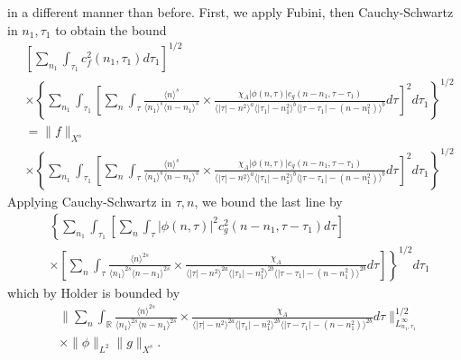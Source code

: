 \documentclass[12pt,reqno]{amsart}
\numberwithin{equation}{section}  %
\newcommand{\rr}{\mathbb{R}}
\begin{document}
in a different manner than before. First, we apply 
Fubini, then Cauchy-Schwartz in $n_{1}, \tau_{1}$ to obtain the bound
%
%
\begin{equation*}
\begin{split}
  & \left[ \sum_{n_{1}} \int_{\tau_{1}} c_{f}^{2}(n_{1}, \tau_{1}) d \tau_{1}
  \right]^{1/2}
  \\
  & \times \left \{ \sum_{n_{1}} \int_{\tau_{1}}   
 \left[
 \sum_{n} \int_{\tau}
   \frac{\langle n \rangle ^{s}}{\langle n_{1} \rangle ^{s} \langle
   n - n_{1}\rangle ^{s}} \times \frac{\chi_{A} |\phi(n, \tau)| c_{g}(n -
   n_{1}, \tau - \tau_{1})
}{\langle | \tau | - n^{2} \rangle
  ^{a} \langle | \tau_{1} | - n_{1}^{2} \rangle ^{b} \langle | \tau -
  \tau_{1} | - (n - n_{1}^{2}) \rangle ^{b}} d \tau 
  \right]^{2} d \tau_{1} \right \}^{1/2}
  \\
  & = \| f \|_{X^{s}}
  \\
  & \times \left \{ \sum_{n_{1}} \int_{\tau_{1}}   
 \left[
 \sum_{n} \int_{\tau}
   \frac{\langle n \rangle ^{s}}{\langle n_{1} \rangle ^{s} \langle
   n - n_{1}\rangle ^{s}} \times \frac{\chi_{A}|\phi(n, \tau)| c_{g}(n -
   n_{1}, \tau - \tau_{1})
}{\langle | \tau | - n^{2} \rangle
  ^{a} \langle | \tau_{1} | - n_{1}^{2} \rangle ^{b} \langle | \tau -
  \tau_{1} | - (n - n_{1}^{2}) \rangle ^{b}} d \tau 
  \right]^{2} d \tau_{1}  \right \}^{1/2}
\end{split}
\end{equation*}
%
Applying Cauchy-Schwartz in $\tau, n$, we bound the last line by 
%
%
\begin{equation*}
\begin{split}
  & \left \{ \sum_{n_{1}} \int_{\tau_{1}}   
  \left [ \sum_{n} \int_{\tau}
  | \phi(n, \tau)|^{2} c_{g}^{2}(n - n_{1}, \tau - \tau_{1}) d \tau  
    \right ] \right . 
   \\
   & \left. \times \left [ \sum_{n} \int_{\tau} \frac{\langle n \rangle
   ^{2s}}{\langle n_{1} \rangle ^{2s} \langle n - n_{1}\rangle ^{2s}}
   \times \frac{\chi_{A}}{\langle | \tau | - n^{2} \rangle ^{2a} \langle | \tau_{1} |
   - n_{1}^{2} \rangle^{2b}  \langle | \tau - \tau_{1} | - (n - n_{1}^{2})
   \rangle^{2b} } d \tau  \right ] \right \}^{1/2}d \tau_{1} 
\end{split}
\end{equation*}
%
%
which by Holder is bounded by 
%
%
%
\begin{equation}
  \label{integral-bound-2nd-form-per}
\begin{split}
  & \| \sum_{n} \int_{\rr} \frac{\langle n \rangle ^{2s}}{\langle n_{1} \rangle ^{2s} \langle
  n - n_{1}\rangle ^{2s}}  \times \frac{\chi_{A}}{\langle | \tau | - n^{2} \rangle
  ^{2a} \langle | \tau_{1} | - n_{1}^{2} \rangle^{2b}  \langle | \tau -
  \tau_{1} | - (n - n_{1}^{2}) \rangle^{2b} } d \tau 
  \|_{L^{\infty}_{n_{1}, \tau_{1}}}^{1/2}
  \\
  & \times \|\phi\|_{L^{2}} \| g \|_{X^{s}}.
\end{split}
\end{equation}
\end{document}
